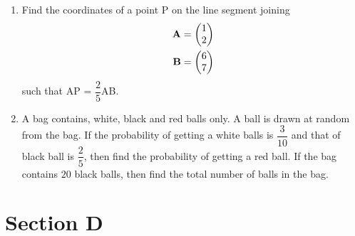 \documentclass[journal,12pt,twocolumn]{IEEEtran}
\renewcommand\thesection{\arabic{section}}
\begin{document}
\begin{enumerate}[label=\thesection.\arabic*.,ref=\thesection.\theenumi]
\item Find the coordinates of a point P on the line segment joining
\begin{align*}
\mathbf{A} &= \begin{pmatrix}1\\2\end{pmatrix}\\
\mathbf{B} &= \begin{pmatrix}6\\7\end{pmatrix}
\end{align*}
such that AP = $\dfrac{2}{5}$AB.
\item A bag contains, white, black and red balls only. A ball is drawn at random from the bag. If the probability of getting a white balls is $\dfrac{3}{10}$ and that of black ball is $\dfrac{2}{5}$, then find the probability of getting a red ball. If the bag contains $20$ black balls, then find the total number of balls in the bag.
\end{enumerate}
\section{Section D}
\renewcommand{\theequation}{\theenumi}
\end{document}
